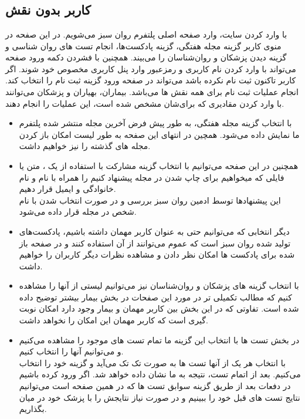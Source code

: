 \documentclass[a4paper]{article}
\begin{document}
	
	\section{}
	\subsection{کاربر بدون نقش}
با وارد کردن  سایت، وارد صفحه اصلی پلتفرم روان سبز می‌شویم.
در این صفحه در منوی کاربر گزینه مجله هفتگی، گزینه پادکست‌ها، انجام تست های روان شناسی و گزینه دیدن پزشکان و روان‌شناسان را می‌بیند.
همچنین با فشردن دکمه ورود صفحه می‌تواند با وارد کردن نام کاربری و رمزعبور وارد پنل کاربری مخصوص خود شوند.
اگر کاربر تاکنون ثبت نام نکرده باشد می‌تواند در صفحه ورود گزینه ثبت نام را انتخاب کند.
انجام عملیات ثبت نام برای همه نقش ها می‌باشد. بیماران، بهیاران و پزشکان می‌توانند با وارد کردن مقادیری که برای‌شان مشخص شده است، این عملیات را انجام دهند.

	\begin{itemize}
		\item با انتخاب گزینه مجله هفتگی، به طور پیش فرض آخرین مجله منتشر شده پلتفرم ما نمایش داده می‌شود. همچین در انتهای این صفحه به طور لیست امکان باز کردن مجله های گذشته را نیز خواهیم داشت.
		
		\item همچنین در این صفحه می‌توانیم با انتخاب گزینه مشارکت با استفاده از یک ، متن یا فایلی که میخواهیم برای چاپ شدن در مجله پیشنهاد کنیم را همراه با نام و نام خانوادگی و ایمیل قرار دهیم.\\
		این پیشنهادها توسط ادمین روان سبز بررسی و در صورت انتخاب شدن با نام شخص در مجله قرار داده می‌شود.
		
		\item دیگر انتخابی که می‌توانیم حتی به عنوان کاربر مهمان داشته باشیم، پادکست‌های تولید شده روان سبز است که عموم می‌توانند از آن استفاده کنند و در صفحه باز شده برای پادکست ها امکان نظر دادن و مشاهده نظرات دیگر کاربران را خواهیم داشت.
		
		\item با انتخاب گزینه های پزشکان و روان‌شناسان نیز می‌توانیم لیستی از آنها را مشاهده کنیم که مطالب تکمیلی تر در مورد این صفحات در بخش بیمار بیشتر توضیح داده شده است.
		تفاوتی که در این بخش بین کاربر مهمان و بیمار وجود دارد امکان نوبت گیری است که کاربر مهمان این امکان را نخواهد داشت.
		
		\item در بخش تست ها با انتخاب این گزینه ما تمام تست های موجود را مشاهده می‌کنیم و می‌توانیم آنها را انتخاب کنیم.\\
		با انتخاب هر یک از آنها تست ها به صورت تک تک می‌آید و گزینه خود را انتخاب می‌کنیم. بعد از اتمام تست، نتیجه به ما نشان داده خواهد شد.
		اگر ورود کرده باشیم در دفعات بعد از طریق گزینه سوابق تست ها که در همین صفحه است می‌توانیم نتایج تست های قبل خود را ببینیم و در صورت نیاز نتایجش را با پزشک خود در میان بگذاریم.
	\end{itemize}
\end{document}
